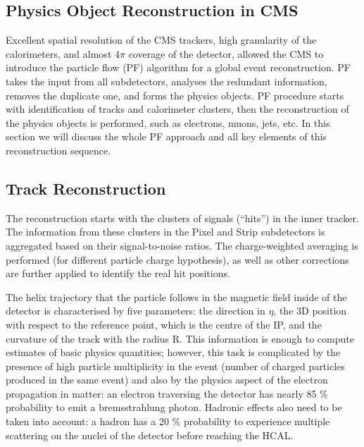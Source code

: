 
\begin{small}

\chapter{Physics Object Reconstruction in CMS} \label{sec:cms_reco}

Excellent spatial resolution of the CMS trackers, high granularity of the calorimeters, and almost $4\pi$ coverage of the detector, allowed the CMS to introduce the particle flow (PF) algorithm \cite{Particle_flow} for a global event reconstruction. PF takes the input from all subdetectors, analyses the redundant information, removes the duplicate one, and forms the physics objects. PF procedure starts with identification of tracks and calorimeter clusters, then the reconstruction of the physics objects is performed, such as electrons, muons, jets, etc. In this section we will discuss the whole PF approach and all key elements of this reconstruction sequence.
    
\section{Track Reconstruction}\label{sec:track_reconstruction}

The reconstruction starts with the clusters of signals (``hits'') in the inner tracker. The information from these clusters in the Pixel and Strip subdetectors is aggregated based on their signal-to-noise ratios. The charge-weighted averaging is performed (for different particle charge hypothesis), as well as other corrections are further applied to identify the real hit positions. 

The helix trajectory that the particle follows in the magnetic field inside of the detector is characterised by five parameters: the direction in $\eta$, the 3D position with respect to the reference point, which is the centre of the IP, and the curvature of the track with the radius R. This information is enough to compute estimates of basic physics quantities; however, this task is complicated by the presence of high particle multiplicity in the event (number of charged particles produced in the same event) and also by the physics aspect of the electron propagation in matter: an electron traversing the detector has nearly 85 $\%$ probability to emit a bremsstrahlung photon. Hadronic effects also need to be taken into account: a hadron has a 20 $\%$ probability to experience multiple scattering on the nuclei of the detector before reaching the HCAL. 


\end{small}
